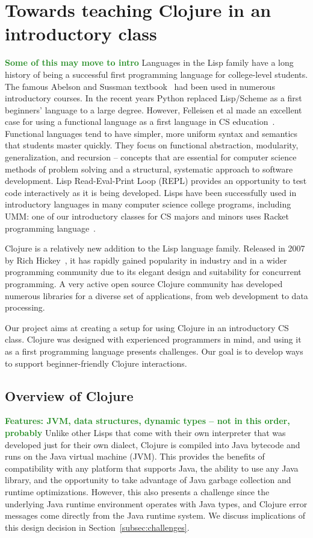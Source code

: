 \documentclass[submission,copyright,creativecommons]{eptcs}
\newcommand{\allcomments}[1]{{#1}}
\newcommand{\emcomment}[1]{{\bf \textcolor{ForestGreen}{\allcomments{{#1}}}}}
\begin{document}
\section{Towards teaching Clojure in an introductory class}\label{sec:project}
\emcomment{Some of this may move to intro}
Languages in the Lisp family have a long history of being a successful first programming language for college-level students.
The famous Abelson and Sussman textbook~\cite{Abelson} had been used in numerous introductory courses.
In the recent years Python replaced Lisp/Scheme as a first beginners' language to a large degree. However, 
Felleisen et al made an excellent case for using a functional language as a first language in  CS education~\cite{Felleisen:2004}.   
Functional languages tend to have simpler, more uniform syntax and semantics that students master quickly.
They focus on functional abstraction, modularity, generalization, and recursion -- concepts that are essential for computer science methods of 
problem solving and a structural, systematic approach to software development. 
Lisp Read-Eval-Print Loop (REPL) provides an opportunity to test code interactively as it is being developed. 
Lisps have been successfully used in introductory languages in many computer science college programs, including UMM: 
one of our introductory classes for CS majors and minors uses Racket programming language~\cite{htdp,htdp2}. 

Clojure is a relatively new addition to the Lisp language family. Released in 2007 by Rich Hickey~\cite{Hickey:2008}, it has rapidly gained popularity in industry
and in a wider programming community 
due to its elegant design and suitability for concurrent programming. A very active open source Clojure community has developed numerous 
libraries for a diverse set of applications, from web development to data processing. 

Our project aims at creating a setup for using Clojure in an introductory CS class. Clojure was designed with experienced programmers in mind, 
and using it as a first programming language presents challenges. Our goal is to develop ways to support beginner-friendly Clojure interactions. 

\subsection{Overview of Clojure}\label{subsec:clojure}

\emcomment{Features: JVM, data structures, dynamic types -- not in this order, probably}
Unlike other Lisps that come with their own interpreter that was developed just for their own dialect, Clojure is compiled 
into Java bytecode and runs on the Java virtual machine (JVM). This provides the benefits of compatibility with 
any platform that supports Java, the ability to use any Java library, and the opportunity to take advantage of Java 
garbage collection and runtime optimizations. However, this also presents a challenge since the underlying Java 
runtime environment operates with Java types, and Clojure error messages come directly from the Java runtime
system. We discuss implications of this design decision in Section~\ref{subsec:challenges}.
\end{document}
